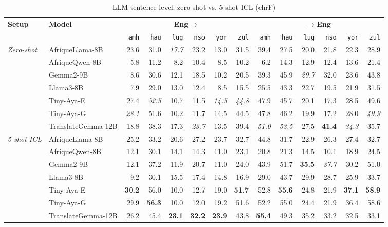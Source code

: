 \begin{table}[t]
\centering
\small
\renewcommand{\arraystretch}{1.05}
\begin{tabular}{llrrrrrrrrrrrr}
\toprule
\textbf{Setup} & \textbf{Model} & \multicolumn{6}{c}{\textbf{Eng$\to$}} & \multicolumn{6}{c}{\textbf{$\to$Eng}} \\
\cmidrule(lr){3-8}\cmidrule(lr){9-14}
  &   & \texttt{amh} & \texttt{hau} & \texttt{lug} & \texttt{nso} & \texttt{yor} & \texttt{zul} & \texttt{amh} & \texttt{hau} & \texttt{lug} & \texttt{nso} & \texttt{yor} & \texttt{zul} \\
\midrule
\multirow{7}{*}{\textit{Zero-shot}} & AfriqueLlama-8B & 23.6 & 31.0 & \emph{17.7} & 23.2 & 13.0 & 31.5 & 39.4 & 27.5 & 20.0 & 21.8 & 22.3 & 28.9 \\
 & AfriqueQwen-8B & 5.8 & 11.2 & 8.2 & 10.4 & 8.5 & 10.2 & 6.2 & 14.3 & 12.9 & 12.4 & 13.6 & 21.4 \\
 & Gemma2-9B & 8.6 & 30.6 & 12.1 & 18.5 & 10.2 & 20.5 & 39.3 & 45.9 & \emph{29.7} & 32.0 & 23.6 & 43.8 \\
 & Llama3-8B & 7.9 & 29.0 & 13.0 & 12.4 & 8.5 & 15.5 & 25.5 & 43.3 & 22.7 & 19.5 & 21.9 & 31.5 \\
 & Tiny-Aya-E & 27.4 & \emph{52.5} & 10.7 & 11.5 & \emph{14.5} & \emph{44.8} & 47.9 & 45.7 & 20.1 & 17.3 & 28.5 & 49.6 \\
 & Tiny-Aya-G & \emph{28.1} & 51.6 & 10.2 & 11.7 & 14.5 & 44.5 & 47.8 & 46.2 & 19.9 & 17.2 & 28.0 & \emph{49.9} \\
 & TranslateGemma-12B & 18.8 & 38.3 & 17.3 & \emph{23.7} & 13.5 & 39.4 & \emph{51.0} & \emph{53.5} & 27.5 & \textbf{41.4} & \emph{34.3} & 35.7 \\
\midrule
\multirow{7}{*}{\textit{5-shot ICL}} & AfriqueLlama-8B & 25.2 & 33.2 & 20.6 & 27.2 & 23.7 & 32.7 & 44.8 & 31.7 & 22.9 & 26.3 & 27.4 & 32.7 \\
 & AfriqueQwen-8B & 12.1 & 30.1 & 14.1 & 14.3 & 11.0 & 23.1 & 20.8 & 21.3 & 14.5 & 10.1 & 18.9 & 24.5 \\
 & Gemma2-9B & 12.1 & 37.2 & 11.9 & 20.7 & 11.0 & 24.0 & 43.9 & 51.7 & \textbf{35.5} & \emph{37.7} & 30.2 & 51.0 \\
 & Llama3-8B & 9.2 & 30.1 & 15.5 & 17.4 & 14.8 & 16.9 & 29.0 & 43.7 & 29.9 & 28.7 & 25.9 & 33.7 \\
 & Tiny-Aya-E & \textbf{30.2} & 56.0 & 10.0 & 12.7 & 19.0 & \textbf{51.7} & 52.8 & \textbf{55.6} & 24.8 & 21.9 & \textbf{37.1} & \textbf{58.9} \\
 & Tiny-Aya-G & 29.9 & \textbf{56.3} & 10.0 & 12.0 & 19.2 & 51.6 & 52.2 & 55.0 & 24.4 & 21.9 & 36.4 & 58.6 \\
 & TranslateGemma-12B & 26.2 & 45.4 & \textbf{23.1} & \textbf{32.2} & \textbf{23.9} & 43.8 & \textbf{55.4} & 49.3 & 35.2 & 33.2 & 32.5 & 33.1 \\
\bottomrule
\end{tabular}
\caption{LLM sentence-level: zero-shot vs. 5-shot ICL (chrF)}
\label{tab:llm_sentence_chrf}
\end{table}
